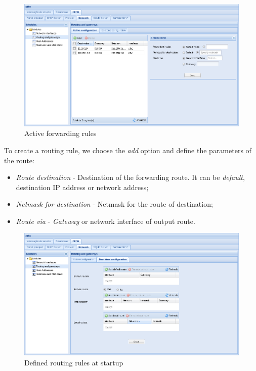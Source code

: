 \begin{figure}[H]
    \begin{center}
    \includegraphics[scale=0.38]{screenshots/etfw/etfw_network_routing_01.png}
    \caption{Active forwarding rules}
    \label{fig:etfw_network_routing_01}
    \end{center}
\end{figure}

To create a routing rule, we choose the \textit{add} option and define the parameters of the route:

\begin{itemize}
    \item \textit{Route destination} - Destination of the forwarding route. It can be \textit{default}, destination IP address or network address;
    \item \textit{Netmask for destination} - Netmask for the route of destination;
    \item \textit{Route via} - \textit{Gateway} or network interface of output route.
\end{itemize}

\begin{figure}[H]
    \begin{center}
    \includegraphics[scale=0.38]{screenshots/etfw/etfw_network_routing_02.png}
    \caption{Defined routing rules at startup}
    \label{fig:etfw_network_routing_02}
    \end{center}
\end{figure}

